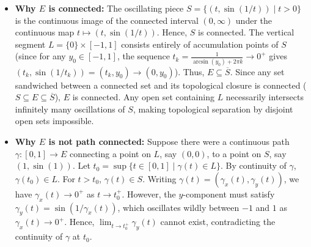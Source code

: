 \begin{content}

\begin{steps}
\begin{itemize}
    \item \textbf{Why $E$ is connected:}
    The oscillating piece $S = \{ (t, \sin(1/t)) \mid t > 0 \}$ is the continuous image of the connected interval $(0, \infty)$ under the continuous map $t \mapsto (t, \sin(1/t))$. Hence, $S$ is connected.
    The vertical segment $L = \{0\} \times [-1, 1]$ consists entirely of accumulation points of $S$ (since for any $y_0 \in [-1, 1]$, the sequence $t_k = \frac{1}{\arcsin(y_0) + 2\pi k} \to 0^+$ gives $(t_k, \sin(1/t_k)) = (t_k, y_0) \to (0, y_0)$).
    Thus, $E \subseteq \overline{S}$. Since any set sandwiched between a connected set and its topological closure is connected ($S \subseteq E \subseteq \overline{S}$), $E$ is connected.
    Any open set containing $L$ necessarily intersects infinitely many oscillations of $S$, making topological separation by disjoint open sets impossible.

    \item \textbf{Why $E$ is not path connected:}
    Suppose there were a continuous path $\gamma \colon [0, 1] \to E$ connecting a point on $L$, say $(0, 0)$, to a point on $S$, say $(1, \sin(1))$.
    Let $t_0 = \sup \{ t \in [0, 1] \mid \gamma(t) \in L \}$. By continuity of $\gamma$, $\gamma(t_0) \in L$. For $t > t_0$, $\gamma(t) \in S$.
    Writing $\gamma(t) = (\gamma_x(t), \gamma_y(t))$, we have $\gamma_x(t) \to 0^+$ as $t \to t_0^+$.
    However, the $y$-component must satisfy $\gamma_y(t) = \sin(1/\gamma_x(t))$, which oscillates wildly between $-1$ and $1$ as $\gamma_x(t) \to 0^+$.
    Hence, $\lim_{t \to t_0^+} \gamma_y(t)$ cannot exist, contradicting the continuity of $\gamma$ at $t_0$.
\end{itemize}
\end{steps}
\end{content}

